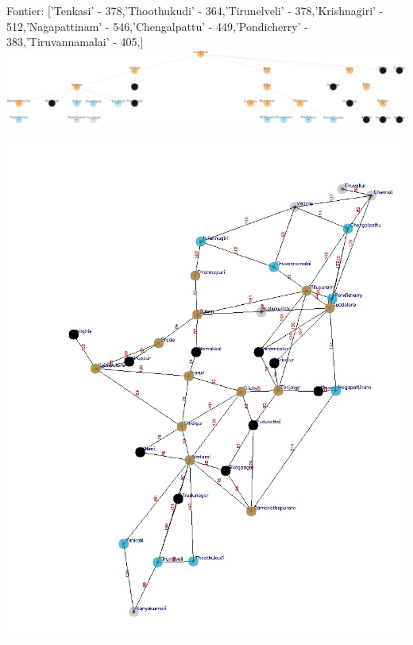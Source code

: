 \documentclass[xcolor=table]{beamer}
\begin{document}
\begin{frame}
  { \tiny Fontier: ['Tenkasi' - 378,'Thoothukudi' - 364,'Tirunelveli' - 378,'Krishnagiri' - 512,'Nagapattinam' - 546,'Chengalpattu' - 449,'Pondicherry' - 383,'Tiruvannamalai' - 405,]}
  \includegraphics[width=1\textwidth]{../UCSNodes/35-1.png}
  \begin{center}
    \includegraphics[height=0.6\textheight]{../UCSoutput/tamilUCS32.jpg}
  \end{center}
\end{frame}
\end{document}
